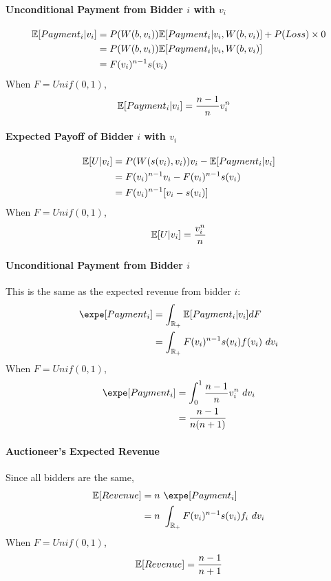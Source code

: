 \documentclass{article}
\begin{document}
	\paragraph{Unconditional Payment from Bidder $i$ with $v_i$}
	\begin{align}
		\mathbb{E}[{Payment_i|v_i}] &= P(W(b, v_i)) \mathbb{E}[{Payment_i|v_i, W(b, v_i)}] + P(Loss) \times 0 \\
		&= P(W(b, v_i)) \mathbb{E}[{Payment_i|v_i, W(b, v_i)}] \\
		&= F(v_i)^{n-1} s(v_i)
	\end{align}
	When $F = Unif(0, 1)$,
	\begin{align}
		\mathbb{E}[{Payment_i|v_i}] &= \frac{n-1}{n}v_i^n
	\end{align}

	\paragraph{Expected Payoff of Bidder $i$ with $v_i$}
	\begin{align}
		\mathbb{E}[{U|v_i}]
		&= P(W(s(v_i), v_i)) v_i - \mathbb{E}[{Payment_i|v_i}] \\
		&= F(v_i)^{n-1} v_i - F(v_i)^{n-1}s(v_i) \\
		&= F(v_i)^{n-1} [v_i - s(v_i)]
	\end{align}
	When $F = Unif(0, 1)$,
	\begin{align}
		\mathbb{E}[{U|v_i}] = \frac{v_i^n}{n}
	\end{align}
	
	\paragraph{Unconditional Payment from Bidder $i$} This is the same as the expected revenue from bidder $i$:
	\begin{align}
		\expe [Payment_i] &= \int_{\R_+} \expect{Payment_i|v_i} dF \\
		&= \int_{\R_+} F(v_i)^{n-1} s(v_i) f(v_i)\ dv_i
	\end{align}
	When $F = Unif(0, 1)$,
	\begin{align}
		\expe [Payment_i] &= \int_0^1 \frac{n-1}{n}v_i^n\ dv_i \\
		&= \frac{n-1}{n(n+1)}
	\end{align}
	
	\paragraph{Auctioneer's Expected Revenue} Since all bidders are the same,
	\begin{align}
		\expect{Revenue} &= n\ \expe [Payment_i] \\
		&= n\ \int_{\R_+} F(v_i)^{n-1} s(v_i) f_i\ dv_i
	\end{align}
	When $F = Unif(0, 1)$,
	\begin{align}
		\mathbb{E}[{Revenue}] = \frac{n-1}{n+1}
	\end{align}
	
\end{document}
